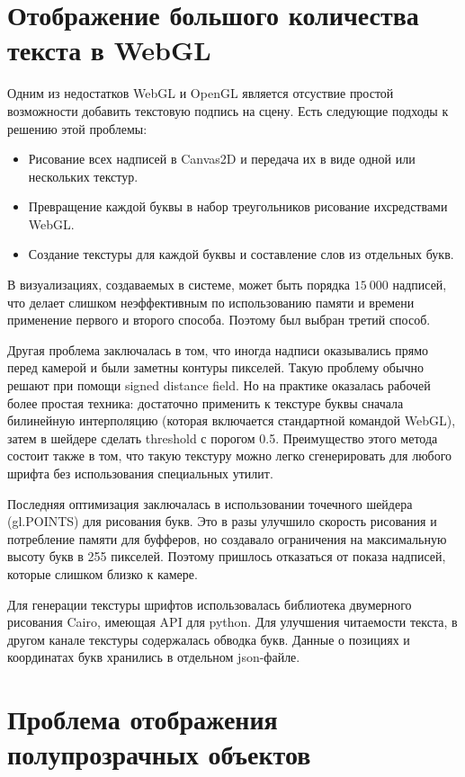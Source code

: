 \section{Отображение большого количества текста в WebGL}

Одним из недостатков WebGL и OpenGL является отсуствие простой возможности добавить текстовую подпись на сцену. Есть следующие подходы к решению этой проблемы:

\begin{itemize}
\item Рисование всех надписей в Canvas2D и передача их в виде одной или нескольких текстур.
\item Превращение каждой буквы в набор треугольников рисование ихсредствами WebGL.
\item Создание текстуры для каждой буквы и составление слов из отдельных букв.
\end{itemize}

В визуализациях, создаваемых в системе, может быть порядка $15\ 000$ надписей, что делает слишком неэффективным по использованию памяти и времени применение первого и второго способа. Поэтому был выбран третий способ.

Другая проблема заключалась в том, что иногда надписи оказывались прямо перед камерой и были заметны контуры пикселей. Такую проблему обычно решают при помощи signed distance field. Но на практике оказалась рабочей более простая техника: достаточно применить к текстуре буквы сначала билинейную интерполяцию (которая включается стандартной командой WebGL), затем в шейдере сделать threshold с порогом 0.5. Преимущество этого метода состоит также в том, что такую текстуру можно легко сгенерировать для любого шрифта без использования специальных утилит.

Последняя оптимизация заключалась в использовании точечного шейдера (gl.POINTS) для рисования букв. Это в разы улучшило скорость рисования и потребление памяти для буфферов, но создавало ограничения на максимальную высоту букв в 255 пикселей. Поэтому пришлось отказаться от показа надписей, которые слишком близко к камере.

Для генерации текстуры шрифтов использовалась библиотека двумерного рисования Cairo, имеющая API для python. Для улучшения читаемости текста, в другом канале текстуры содержалась обводка букв. Данные о позициях и координатах букв хранились в отдельном json-файле.

\section{Проблема отображения полупрозрачных объектов}

